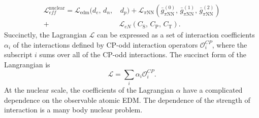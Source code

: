 \begin{equation}
    \begin{split}
        \mathcal{L}^{\textrm{nuclear}}_{eff} =  \mathcal{L}_{\textrm{edm}} (d_e, \, d_n, & \, d_p)+  \mathcal{L}_{\pi \textrm{NN}}(\bar{g}^{(0)}_{\pi \textrm{NN}}, \, \bar{g}^{(1)}_{\pi \textrm{NN}}, \, \bar{g}^{(2)}_{\pi \textrm{NN}} )\\+ 
        & \mathcal{L}_{eN}(C_{\textrm{S}}, \, C_{\textrm{P}}, \, C_{\textrm{T}}).
    \end{split}
\end{equation}
%
%
Succinctly, the Lagrangian $\mathcal{L}$ can be expressed as a set of interaction coefficients $\alpha_i$ of the interactions defined by CP-odd interaction operators $\mathcal{O}^{CP}_i$, where the subscript $i$ sums over all of the CP-odd interactions. The succinct form of the Langrangian is 
\begin{equation}
    \mathcal{L} = \sum_i \alpha_i \mathcal{O}^{CP}_i.
\end{equation}
 At the nuclear scale, the coefficients of the Lagrangian $\alpha$ have a complicated dependence on the observable atomic EDM. The dependence of the strength of interaction is a many body nuclear problem. 
 

